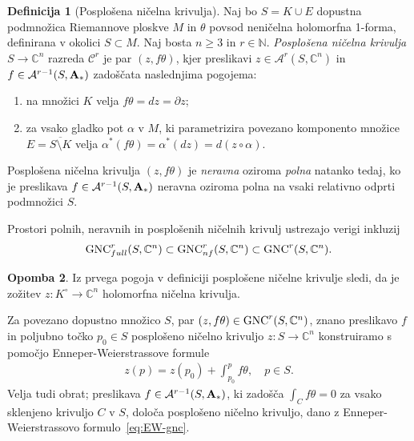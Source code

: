 \documentclass[12pt,a4paper,twoside]{article}
\theoremstyle{definition} %
\newtheorem{definicija}{Definicija}[section]
\newtheorem{opomba}[definicija]{Opomba}
\theoremstyle{plain} %
\numberwithin{equation}{section}  %
\newcommand{\N}{\mathbb N}
\newcommand{\C}{\mathbb C}
\begin{document}
\begin{definicija} [Posplošena ničelna krivulja]
Naj bo $S = K \cup E$ dopustna podmnožica Riemannove ploskve $M$ in $\theta$ povsod neničelna holomorfna 1-forma, definirana v okolici $S \subset M$.
Naj bosta $n \geq 3$ in $r \in \N$. \emph{Posplošena ničelna krivulja} $S \to \C^{n}$ razreda $\mathcal{C}^{r}$ je par $(z, f \theta)$, kjer preslikavi $z \in \mathcal{A}^{r}(S, \C^{n})$ in $f \in \mathcal{A}^{r-1}(S, \textbf{\textup{A}}_{*})$ zadoščata naslednjima pogojema:
\begin{enumerate}
\item na množici $K$ velja $f \theta = dz = \partial z$;
\item za vsako gladko pot $\alpha$ v $M$, ki parametrizira povezano komponento množice $E = \overline{S \setminus K}$ velja $ \alpha^{*}(f \theta) = \alpha^{*}(dz) = d(z \circ \alpha)$.
\end{enumerate}
%
Posplošena ničelna krivulja $(z, f \theta)$ je \emph{neravna} oziroma \emph{polna} natanko tedaj, ko je preslikava $f \in \mathcal{A}^{r-1}(S, \textbf{\textup{A}}_{*})$ neravna oziroma polna na vsaki relativno odprti podmnožici $S$.
\end{definicija}

Prostori polnih, neravnih in posplošenih ničelnih krivulj ustrezajo verigi inkluzij
\begin{gather*}
\textup{GNC}_{full}^{r}(S, \C^{n}) \subset \textup{GNC}_{nf}^{r}(S, \C^{n}) \subset \textup{GNC}^{r}(S, \C^{n}).
\end{gather*}

\begin{opomba}
Iz prvega pogoja v definiciji posplošene ničelne krivulje sledi, da je zožitev $z \colon K^{\circ} \to \mathbb{C}^{n}$ holomorfna ničelna krivulja.
\end{opomba}

Za povezano dopustno množico $S$, par $(z, f \theta) \in \textup{GNC}^{r}(S, \C^{n})$, znano preslikavo $f$ in poljubno točko $p_{0} \in S$ posplošeno ničelno krivuljo $z \colon S \to \C^{n}$ konstruiramo s pomočjo Enneper-Weierstrassove formule
\begin{gather} \label{eq:EW-gnc}
z(p) = z(p_{0}) + \int_{p_0}^{p} f \theta, \quad p \in S.
\end{gather} 
Velja tudi obrat; preslikava $f \in \mathcal{A}^{r-1}(S, \textbf{\textup{A}}_{*})$, ki zadošča $\int_{C} f \theta = 0$ za vsako sklenjeno krivuljo $C$ v $S$, določa posplošeno ničelno krivuljo, dano z Enneper-Weierstrassovo formulo~\eqref{eq:EW-gnc}.
\end{document}
